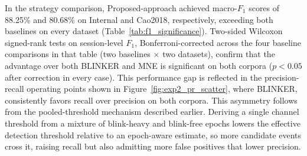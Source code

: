 In the strategy comparison, Proposed-approach achieved macro-$F_1$ scores of 88.25\% and 80.68\% on Internal and Cao2018, respectively, exceeding both baselines on every dataset (Table~\ref{tab:f1_significance}). Two-sided Wilcoxon signed-rank tests on session-level $F_1$, Bonferroni-corrected across the four baseline comparisons in that table (two baselines $\times$ two datasets), confirm that the advantage over both BLINKER and MNE is significant on both corpora ($p<0.05$ after correction in every case). This performance gap is reflected in the precision-recall operating points shown in Figure~\ref{fig:exp2_pr_scatter}, where BLINKER, consistently favors recall over precision on both corpora. This asymmetry follows from the pooled-threshold mechanism described earlier. Deriving a single channel threshold from a mixture of blink-heavy and blink-free epochs lowers the effective detection threshold relative to an epoch-aware estimate, so more candidate events cross it, raising recall but also admitting more false positives that lower precision.